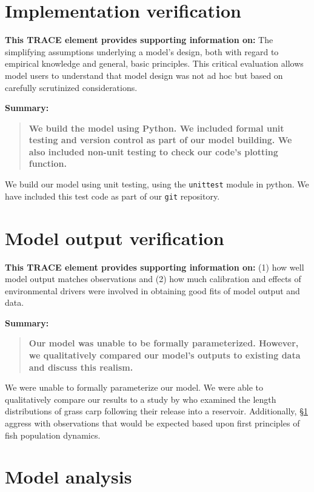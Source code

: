 \documentclass{article}[12pt]
\begin{document}
\section{Implementation verification}\label{sec:IpVer}
\textbf{This TRACE element provides supporting information on:} The simplifying assumptions underlying a model's design, both with regard to empirical knowledge and general, basic principles. This critical evaluation allows model users to understand that model design was not ad hoc but based on carefully scrutinized considerations. 

\textbf{Summary:}
\begin{verse}
\textbf{ 
We build the model using Python.
We included formal unit testing and version control as part of our model building.
We also included non-unit testing to check our code's plotting function.
}
\end{verse}

We build our model using unit testing, using the \texttt{unittest} module in python.
We have included this test code as part of our \texttt{git} repository.  

\section{Model output verification}

\textbf{This TRACE element provides supporting information on:} (1) how well model output matches observations and (2) how much calibration and effects of environmental drivers were involved in obtaining good fits of model output and data. 

\textbf{Summary:}
\begin{verse}
\textbf{
Our model was unable to be formally parameterized. 
However, we qualitatively compared our model's outputs to existing data and discuss this realism. 
}
\end{verse}

We were unable to formally parameterize our model. 
We were able to qualitatively compare our results to a study by \citet{martyn1986mapping} who examined the length distributions of grass carp following their release into a reservoir.
Additionally, \S \ref{sec:IpVer} aggress with observations that would be expected based upon first principles of fish population dynamics. 

\section{Model analysis}
\end{document}
